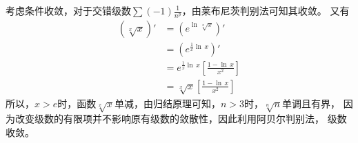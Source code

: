 \documentclass{article}
\begin{document}
\begin{itemize}
\begin{itemize}
                考虑条件收敛，对于交错级数$\sum (-1) \frac{1}{n^p}$，由莱布尼茨判别法可知其收敛。
                又有
                \begin{align*}
                  (\sqrt[x]{x})'
                   & = (e^{\ln\, \sqrt[x]{x}})'                                     \\
                   & = (e^{\frac{1}{x} \ln\, x})'                                   \\
                   & = e^{\frac{1}{x} \ln\, x} \left[\frac{1 - \ln\, x}{x^2}\right] \\
                   & = \sqrt[x]{x} \left[\frac{1 - \ln\, x}{x^2}\right]
                \end{align*}
                所以，$x > e$时，函数$\sqrt[x]{x}$单减，由归结原理可知，$n > 3$时，$\sqrt[n]{n}$单调且有界，
                因为改变级数的有限项并不影响原有级数的敛散性，因此利用阿贝尔判别法，
                级数收敛。
        \end{itemize}

\end{itemize}
\end{document}
